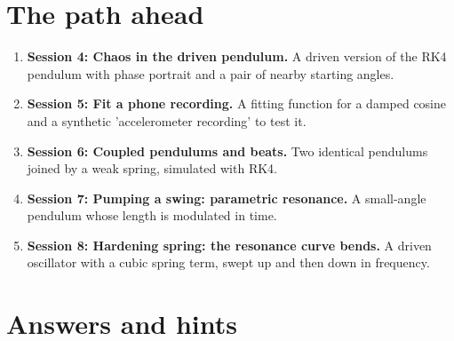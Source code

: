 \documentclass[11pt,a4paper]{article}
\begin{document}
\section{The path ahead}
\begin{enumerate}[nosep]
\item \textbf{Session 4: Chaos in the driven pendulum.} A driven version of the RK4 pendulum with phase portrait and a pair of nearby starting angles.
\item \textbf{Session 5: Fit a phone recording.} A fitting function for a damped cosine and a synthetic 'accelerometer recording' to test it.
\item \textbf{Session 6: Coupled pendulums and beats.} Two identical pendulums joined by a weak spring, simulated with RK4.
\item \textbf{Session 7: Pumping a swing: parametric resonance.} A small-angle pendulum whose length is modulated in time.
\item \textbf{Session 8: Hardening spring: the resonance curve bends.} A driven oscillator with a cubic spring term, swept up and then down in frequency.
\end{enumerate}

\section{Answers and hints}
\end{document}

